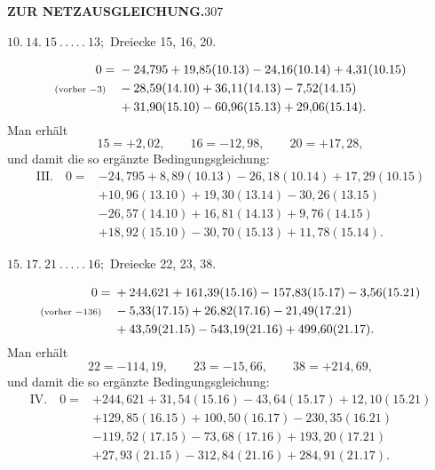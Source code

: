 \newpage
\noindent\textbf{ZUR NETZAUSGLEICHUNG.}\hfill307
\begin{center}
$10.\ 14.\ 15\ .\,.\,.\,.\,.\ 13;$ Dreiecke 15, 16, 20.
\end{center}
\[
\begin{aligned}
0={}&-24{,}795+19{,}85(10.13)-24{,}16(10.14)+4{,}31(10.15)\\
\text{\scriptsize(vorher $-3$)}\quad&-28{,}59(14.10)+36{,}11(14.13)-7{,}52(14.15)\\
&+31{,}90(15.10)-60{,}96(15.13)+29{,}06(15.14).
\end{aligned}
\]
Man erhält
\[
15=+2{,}02,\qquad16=-12{,}98,\qquad20=+17{,}28,
\]
und damit die so ergänzte Bedingungsgleichung:
\[
\begin{aligned}
\mathrm{III.}\quad0={}&-24{,}795+8{,}89(10.13)-26{,}18(10.14)+17{,}29(10.15)\\
&+10{,}96(13.10)+19{,}30(13.14)-30{,}26(13.15)\\
&-26{,}57(14.10)+16{,}81(14.13)+9{,}76(14.15)\\
&+18{,}92(15.10)-30{,}70(15.13)+11{,}78(15.14).
\end{aligned}
\]

\par\bigskip
\begin{center}
$15.\ 17.\ 21\ .\,.\,.\,.\,.\ 16;$ Dreiecke 22, 23, 38.
\end{center}
\[
\begin{aligned}
0={}&+244{,}621+161{,}39(15.16)-157{,}83(15.17)-3{,}56(15.21)\\
\text{\scriptsize(vorher $-136$)}\quad&-5{,}33(17.15)+26{,}82(17.16)-21{,}49(17.21)\\
&+43{,}59(21.15)-543{,}19(21.16)+499{,}60(21.17).
\end{aligned}
\]
Man erhält
\[
22=-114{,}19,\qquad23=-15{,}66,\qquad38=+214{,}69,
\]
und damit die so ergänzte Bedingungsgleichung:
\[
\begin{aligned}
\mathrm{IV.}\quad0={}&+244{,}621+31{,}54(15.16)-43{,}64(15.17)+12{,}10(15.21)\\
&+129{,}85(16.15)+100{,}50(16.17)-230{,}35(16.21)\\
&-119{,}52(17.15)-73{,}68(17.16)+193{,}20(17.21)\\
&+27{,}93(21.15)-312{,}84(21.16)+284{,}91(21.17).
\end{aligned}
\]

